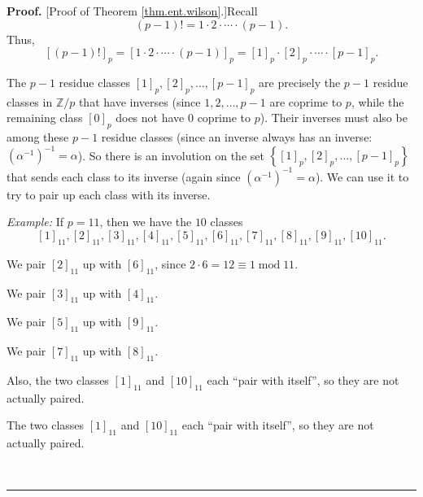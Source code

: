\documentclass[numbers=enddot,12pt,final,onecolumn,notitlepage]{scrartcl}%
\numberwithin{exer}{subsection}
\theoremstyle{definition}
\newenvironment{proof}[1][Proof]{\noindent\textbf{#1.} }{\ \rule{0.5em}{0.5em}}
\begin{document}
\begin{proof}
[Proof of Theorem \ref{thm.ent.wilson}.]Recall%
\[
\left(  p-1\right)  !=1\cdot2\cdot\cdots\cdot\left(  p-1\right)  .
\]
Thus,%
\[
\left[  \left(  p-1\right)  !\right]  _{p}=\left[  1\cdot2\cdot\cdots
\cdot\left(  p-1\right)  \right]  _{p}=\left[  1\right]  _{p}\cdot\left[
2\right]  _{p}\cdot\cdots\cdot\left[  p-1\right]  _{p}.
\]


The $p-1$ residue classes $\left[  1\right]  _{p},\left[  2\right]
_{p},\ldots,\left[  p-1\right]  _{p}$ are precisely the $p-1$ residue classes
in $\mathbb{Z}/p$ that have inverses (since $1,2,\ldots,p-1$ are coprime to
$p$, while the remaining class $\left[  0\right]  _{p}$ does not have $0$
coprime to $p$). Their inverses must also be among these $p-1$ residue classes
(since an inverse always has an inverse: $\left(  \alpha^{-1}\right)
^{-1}=\alpha$). So there is an involution on the set $\left\{  \left[
1\right]  _{p},\left[  2\right]  _{p},\ldots,\left[  p-1\right]  _{p}\right\}
$ that sends each class to its inverse (again since $\left(  \alpha
^{-1}\right)  ^{-1}=\alpha$). We can use it to try to pair up each class with
its inverse.

\textit{Example:} If $p=11$, then we have the $10$ classes%
\[
\left[  1\right]  _{11},\left[  2\right]  _{11},\left[  3\right]
_{11},\left[  4\right]  _{11},\left[  5\right]  _{11},\left[  6\right]
_{11},\left[  7\right]  _{11},\left[  8\right]  _{11},\left[  9\right]
_{11},\left[  10\right]  _{11}.
\]


We pair $\left[  2\right]  _{11}$ up with $\left[  6\right]  _{11}$, since
$2\cdot6=12\equiv1\operatorname{mod}11$.

We pair $\left[  3\right]  _{11}$ up with $\left[  4\right]  _{11}$.

We pair $\left[  5\right]  _{11}$ up with $\left[  9\right]  _{11}$.

We pair $\left[  7\right]  _{11}$ up with $\left[  8\right]  _{11}$.

Also, the two classes $\left[  1\right]  _{11}$ and $\left[  10\right]  _{11}$
each \textquotedblleft pair with itself\textquotedblright, so they are not
actually paired.

The two classes $\left[  1\right]  _{11}$ and $\left[  10\right]  _{11}$ each
\textquotedblleft pair with itself\textquotedblright, so they are not actually paired.


\end{proof}
\end{document}
